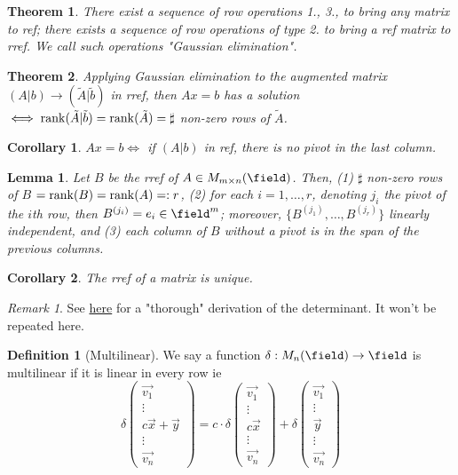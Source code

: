 \documentclass[12pt, oneside]{article}
\theoremstyle{definition}
\newtheorem{defn}{Definition}
\theoremstyle{plain}
\newtheorem{thm}{Theorem}
\newtheorem{cor}{Corollary}
\newtheorem{lemma}{Lemma}
\theoremstyle{remark}
\newtheorem{remark}{Remark}
\begin{document}
\begin{thm}
  There exist a sequence of row operations 1., 3., to bring any matrix to ref; there exists a sequence of row operations of type 2. to bring a ref matrix to rref. We call such operations "Gaussian elimination".
\end{thm}

\begin{thm}
  Applying Gaussian elimination to the augmented matrix $(A \vert b) \to (\tilde{A} \vert \tilde{b})$ in rref, then $A x = b$ has a solution $\iff \rank(\tilde{A} \vert \tilde{b}) = \rank(\tilde{A}) = \sharp$ non-zero rows of $\tilde{A}$.
\end{thm}

\begin{cor}
  $A x = b \iff $ if $(A \vert b)$ in ref, there is no pivot in the last column.
\end{cor}

\begin{lemma}
  Let $B$ be the rref of $A \in M_{m \times n}(\field)$. Then, (1) $\sharp$ non-zero rows of $B$ $ = \rank(B) = \rank(A) =: r$, (2) for each $i = 1, \dots, r$, denoting $j_i$ the pivot of the $i$th row, then $B^{(j_i)} = e_i \in \field^m$; moreover, $\{B^{(j_1)}, \dots, B^{(j_r)}\}$ linearly independent, and (3) each column of $B$ without a pivot is in the span of the previous columns.
\end{lemma}

\begin{cor}
  The rref of a matrix is unique.
\end{cor}

\begin{remark}
  See \href{https://notes.louismeunier.net/Algebra 2/algebra2.pdf#page=52}{here} for a "thorough" derivation of the determinant. It won't be repeated here.
\end{remark}

\begin{defn}[Multilinear]
  We say a function $\delta : M_n(\field) \to \field$ is multilinear if it is linear in every row ie \[
  \delta\begin{pmatrix}
    \vec{v_1}\\
    \vdots\\
    c \vec{x} + \vec{y}\\
    \vdots\\
    \vec{v_n}
  \end{pmatrix}   = c \cdot \delta\begin{pmatrix}
    \vec{v_1}\\
    \vdots\\
    c \vec{x}\\
    \vdots\\
    \vec{v_n}
  \end{pmatrix} + \delta\begin{pmatrix}
    \vec{v_1}\\
    \vdots\\
    \vec{y}\\
    \vdots\\
    \vec{v_n}
  \end{pmatrix} 
  \]
\end{defn}
\end{document}
